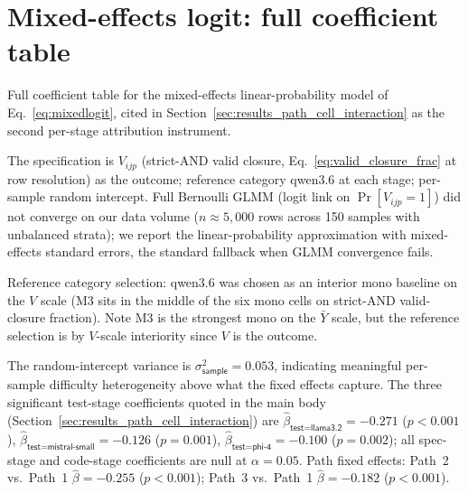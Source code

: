 \section{Mixed-effects logit: full coefficient table}
\label{sec:appendix_mixed_logit}

Full coefficient table for the mixed-effects linear-probability model
of Eq.~\ref{eq:mixedlogit}, cited in Section~\ref{sec:results_path_cell_interaction}
as the second per-stage attribution instrument.



The specification is $V_{ijp}$ (strict-AND valid closure, Eq.~\ref{eq:valid_closure_frac}
at row resolution) as the outcome; reference category qwen3.6 at each stage; per-sample
random intercept. Full Bernoulli GLMM (logit link on $\Pr[V_{ijp} = 1]$) did not
converge on our data volume ($n \approx 5{,}000$ rows across 150 samples with unbalanced
strata); we report the linear-probability approximation with mixed-effects standard
errors, the standard fallback when GLMM convergence fails.

Reference category selection: qwen3.6 was chosen as an interior mono baseline on the
$V$ scale (M3 sits in the middle of the six mono cells on strict-AND valid-closure
fraction). Note M3 is the strongest mono on the $\bar{Y}$ scale, but the reference
selection is by $V$-scale interiority since $V$ is the outcome.

The random-intercept variance is $\sigma_{\textsf{sample}}^2 = 0.053$, indicating
meaningful per-sample difficulty heterogeneity above what the fixed effects capture.
The three significant test-stage coefficients quoted in the main body
(Section~\ref{sec:results_path_cell_interaction}) are $\hat{\beta}_{\textsf{test}=\textsf{llama3.2}} = -0.271$
($p < 0.001$), $\hat{\beta}_{\textsf{test}=\textsf{mistral-small}} = -0.126$ ($p = 0.001$),
$\hat{\beta}_{\textsf{test}=\textsf{phi-4}} = -0.100$ ($p = 0.002$); all spec-stage and code-stage
coefficients are null at $\alpha = 0.05$. Path fixed effects: Path~2 vs.\ Path~1
$\hat{\beta} = -0.255$ ($p < 0.001$); Path~3 vs.\ Path~1 $\hat{\beta} = -0.182$
($p < 0.001$).

